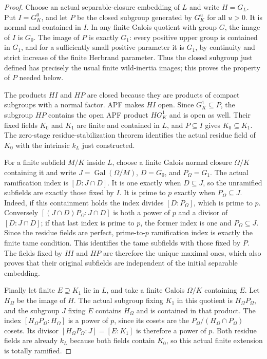\begin{proof}
Choose an actual separable-closure embedding of $L$ and write $H=G_L$.
Put $I=G_K^0$, and let $P$ be the closed subgroup generated by
$G_K^u$ for all $u>0$. It is normal and contained in $I$.
In any finite Galois quotient with group $G$, the image of $I$ is
$G_0$. The image of $P$ is exactly $G_1$: every positive upper group
is contained in $G_1$, and for a sufficiently small positive parameter
it is $G_1$, by continuity and strict increase of the finite Herbrand
parameter. Thus the closed subgroup just defined has precisely the
usual finite wild-inertia images; this proves the property of $P$
needed below.

The products $HI$ and $HP$ are closed because they are products of
compact subgroups with a normal factor. APF makes $HI$ open.
Since $G_K^1\subseteq P$, the subgroup $HP$ contains the open APF
product $HG_K^1$ and is open as well.
Their fixed fields $K_0$ and $K_1$ are finite and contained in $L$,
and $P\subseteq I$ gives $K_0\subseteq K_1$.
The zero-stage residue-stabilization theorem identifies the actual
residue field of $K_0$ with the intrinsic $k_L$ just constructed.

For a finite subfield $M/K$ inside $L$, choose a finite Galois
normal closure $\Omega/K$ containing it and write
$J=\operatorname{Gal}(\Omega/M)$, $D=G_0$, and $P_\Omega=G_1$.
The actual ramification index is $[D:J\cap D]$.
It is one exactly when $D\subseteq J$, so the unramified subfields
are exactly those fixed by $I$. It is prime to $p$ exactly when
$P_\Omega\subseteq J$. Indeed, if this containment holds the index
divides $[D:P_\Omega]$, which is prime to $p$. Conversely
$[(J\cap D)P_\Omega:J\cap D]$ is both a power of $p$ and a divisor
of $[D:J\cap D]$; if that last index is prime to $p$, the former
index is one and $P_\Omega\subseteq J$.
Since the residue fields are perfect, prime-to-$p$ ramification index
is exactly the finite tame condition. This identifies the tame
subfields with those fixed by $P$.
The fields fixed by $HI$ and $HP$ are therefore the unique maximal
ones, which also proves that their original subfields are independent
of the initial separable embedding.

Finally let finite $E\supseteq K_1$ lie in $L$, and take a finite
Galois $\Omega/K$ containing $E$. Let $H_\Omega$ be the image of $H$.
The actual subgroup fixing $K_1$ in this quotient is
$H_\Omega P_\Omega$, and the subgroup $J$ fixing $E$ contains
$H_\Omega$ and is contained in that product.
The index $[H_\Omega P_\Omega:H_\Omega]$ is a power of $p$, since
its cosets are the $P_\Omega/(H_\Omega\cap P_\Omega)$ cosets.
Its divisor $[H_\Omega P_\Omega:J]=[E:K_1]$ is therefore a power
of $p$. Both residue fields are already $k_L$ because both fields
contain $K_0$, so this actual finite extension is totally ramified.
\end{proof}

